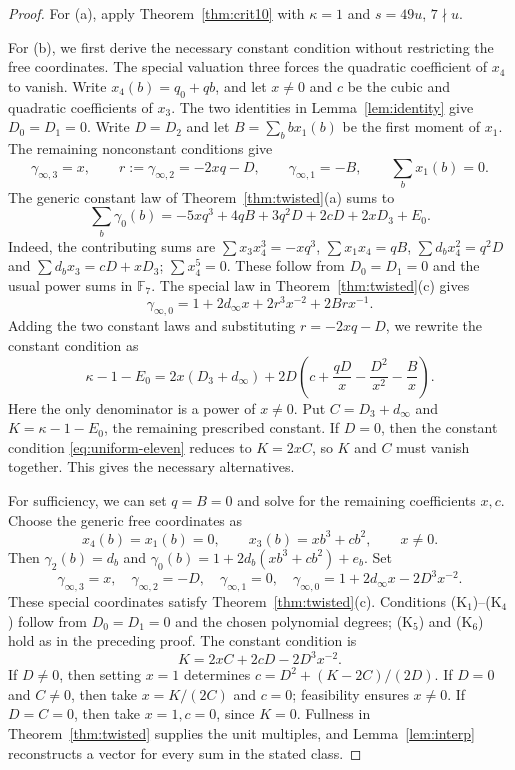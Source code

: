 \documentclass[10pt,a4paper]{amsart}
\newcommand{\F}{\mathbb F}
\begin{document}
\begin{proof}
For (a), apply Theorem~\ref{thm:crit10} with $\kappa=1$ and
$s=49u$, $7\nmid u$.

For (b), we first derive the necessary constant condition without
restricting the free coordinates. The special valuation three
forces the quadratic coefficient of $x_4$ to vanish.
Write $x_4(b)=q_0+qb$, and let
$x\ne0$ and $c$ be the cubic and quadratic coefficients of $x_3$.
The two identities in Lemma~\ref{lem:identity} give $D_0=D_1=0$.
Write $D=D_2$ and let $B=\sum_b b x_1(b)$ be the first moment
of $x_1$. The remaining nonconstant conditions give
\[
 \gamma_{\infty,3}=x,\qquad
 r:=\gamma_{\infty,2}=-2xq-D,\qquad
 \gamma_{\infty,1}=-B,\qquad \sum_bx_1(b)=0.
\]
The generic constant law of Theorem~\ref{thm:twisted}(a) sums to
\begin{equation}\label{eq:generic-constant}
 \sum_b\gamma_0(b)
 =-5xq^3+4qB+3q^2D+2cD+2xD_3+E_0.
\end{equation}
Indeed, the contributing sums are
$\sum x_3x_4^3=-xq^3$, $\sum x_1x_4=qB$,
$\sum d_bx_4^2=q^2D$ and $\sum d_bx_3=cD+xD_3$;
$\sum x_4^5=0$. These follow from $D_0=D_1=0$ and the usual
power sums in $\F_7$.
The special law in Theorem~\ref{thm:twisted}(c) gives
\[
 \gamma_{\infty,0}
 =1+2d_\infty x+2r^3x^{-2}+2Brx^{-1}.
\]
Adding the two constant laws and substituting $r=-2xq-D$, we
rewrite the constant condition as
\begin{equation}\label{eq:uniform-eleven}
 \kappa-1-E_0
 =2x(D_3+d_\infty)
  +2D\left(c+\frac{qD}{x}-\frac{D^2}{x^2}-\frac{B}{x}\right).
\end{equation}
Here the only denominator is a power of $x\ne0$. Put
$C=D_3+d_\infty$ and $K=\kappa-1-E_0$, the remaining prescribed
constant. If $D=0$, then the constant condition
\eqref{eq:uniform-eleven} reduces to $K=2xC$, so $K$ and $C$
must vanish together. This gives the necessary alternatives.

For sufficiency, we can set $q=B=0$ and solve for the remaining
coefficients $x,c$. Choose the generic free coordinates as
\[
 x_4(b)=x_1(b)=0,\qquad x_3(b)=xb^3+cb^2,
 \qquad x\ne0.
\]
Then $\gamma_2(b)=d_b$ and
$\gamma_0(b)=1+2d_b(xb^3+cb^2)+e_b$. Set
\[
 \gamma_{\infty,3}=x,\quad \gamma_{\infty,2}=-D,\quad
 \gamma_{\infty,1}=0,\quad
 \gamma_{\infty,0}=1+2d_\infty x-2D^3x^{-2}.
\]
These special coordinates satisfy Theorem~\ref{thm:twisted}(c).
Conditions (K$_1$)--(K$_4$) follow from
$D_0=D_1=0$ and the chosen polynomial degrees; (K$_5$) and
(K$_6$) hold as in the preceding proof. The constant condition is
\begin{equation}\label{eq:explicit-eleven}
 K=2xC+2cD-2D^3x^{-2}.
\end{equation}
If $D\ne0$, then setting $x=1$ determines
$c=D^2+(K-2C)/(2D)$.
If $D=0$ and $C\ne0$, then take $x=K/(2C)$ and $c=0$;
feasibility ensures $x\ne0$. If $D=C=0$, then take $x=1,c=0$,
since $K=0$.
Fullness in Theorem~\ref{thm:twisted} supplies the unit multiples,
and Lemma~\ref{lem:interp} reconstructs a vector for every sum
in the stated class.
\end{proof}
\end{document}
